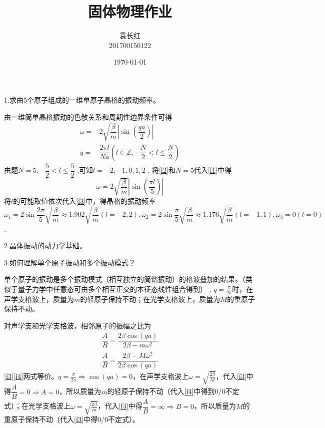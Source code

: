 \documentclass[titlepage]{article}
\begin{document}
\author{袁长红\\201700150122}
\title{固体物理作业}	
\date{\today}
\maketitle

\pagestyle{fancy}
1.求由5个原子组成的一维单原子晶格的振动频率。

由一维简单晶格振动的色散关系和周期性边界条件可得
\begin{align}
\omega=&2\sqrt{\dfrac{\beta}{m}}\left| \sin(\dfrac{qa}{2})\right|\label{f1}\\
q=&\dfrac{2\pi l}{Na}(l\in\mathbb{Z},-\dfrac{N}{2}<l\leqslant\dfrac{N}{2}) \label{f2}
\end{align}
由题$ N=5,-\dfrac{5}{2}<l\leqslant\dfrac{5}{2}$ ,可知$ l=-2,-1,0,1,2 $ . 将\eqref{f2}和$ N=5 $代入\eqref{f1}中得
\begin{equation}\label{f3}
\omega=2\sqrt{\dfrac{\beta}{m}}\left| \sin(\dfrac{\pi l}{5})\right|
\end{equation}
将$ l $的可能取值依次代入\eqref{f3}中，得晶格的振动频率$ \omega_1=2\sin\dfrac{2\pi}{5}\sqrt{\dfrac{\beta}{m}}\approx1.902\sqrt{\dfrac{\beta}{m}}(l=-2,2),\omega_2=2\sin\dfrac{\pi}{5}\sqrt{\dfrac{\beta}{m}}\approx1.176\sqrt{\dfrac{\beta}{m}}(l=-1,1),\omega_3=0(l=0) $.

2.晶体振动的动力学基础。



3.如何理解单个原子振动和多个振动模式？

单个原子的振动是多个振动模式（相互独立的简谐振动）的格波叠加的结果。（类似于量子力学中任意态可由多个相互正交的本征态线性组合得到）
. $ q=\frac{\pi}{2a} $时，在声学支格波上，质量为$ m $的轻原子保持不动；在光学支格波上，质量为$ M $的重原子保持不动。

对声学支和光学支格波，相邻原子的振幅之比为
\begin{align}
\dfrac{A}{B}=\dfrac{2\beta\cos(qa)}{2\beta-m\omega^2}\label{f3}\\
\dfrac{A}{B}=\dfrac{2\beta-M\omega^2}{2\beta\cos(qa)}\label{f4}
\end{align}
\eqref{f3}\eqref{f4}两式等价。$ q=\frac{\pi}{2a}\Rightarrow\cos(qa)=0 $，在声学支格波上$ \omega=\sqrt{\frac{2\beta}{M}} $，代入\eqref{f3}中得$ \dfrac{A}{B}=0\Rightarrow A=0 $，所以质量为$ m $的轻原子保持不动（代入\eqref{f4}中得到0/0不定式）；在光学支格波上$\omega=\sqrt{\frac{2\beta}{m}}  $，代入\eqref{f4}中得$ \dfrac{A}{B}=\infty\Rightarrow B=0 $，所以质量为$ M $的重原子保持不动（代入\eqref{f3}中得0/0不定式）。
\end{document}
